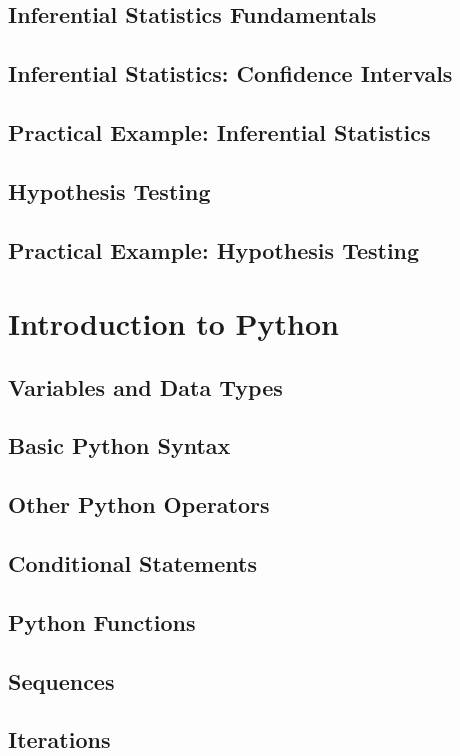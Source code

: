 \documentclass[12pt, a4paper]{article}
\begin{document}
\subsection{Inferential Statistics Fundamentals}
\subsection{Inferential Statistics: Confidence Intervals}
\subsection{Practical Example: Inferential Statistics}
\subsection{Hypothesis Testing}
\subsection{Practical Example: Hypothesis Testing}
\pagebreak

\section{Introduction to Python}
\subsection{Variables and Data Types}
\subsection{Basic Python Syntax}
\subsection{Other Python Operators}
\subsection{Conditional Statements}
\subsection{Python Functions}
\subsection{Sequences}
\subsection{Iterations}
\end{document}
